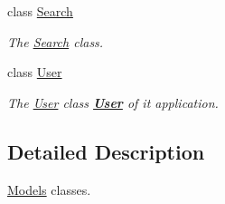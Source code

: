 \begin{DoxyCompactItemize}
class \hyperlink{classModels_1_1Search}{Search}
\begin{DoxyCompactList}\small\item\em The \hyperlink{classModels_1_1Search}{Search} class. \end{DoxyCompactList}\item 
class \hyperlink{classModels_1_1User}{User}
\begin{DoxyCompactList}\small\item\em The \hyperlink{classModels_1_1User}{User} class {\bfseries \hyperlink{classModels_1_1User}{User}} of it application. \end{DoxyCompactList}\end{DoxyCompactItemize}


\subsection{Detailed Description}
\hyperlink{namespaceModels}{Models} classes. 